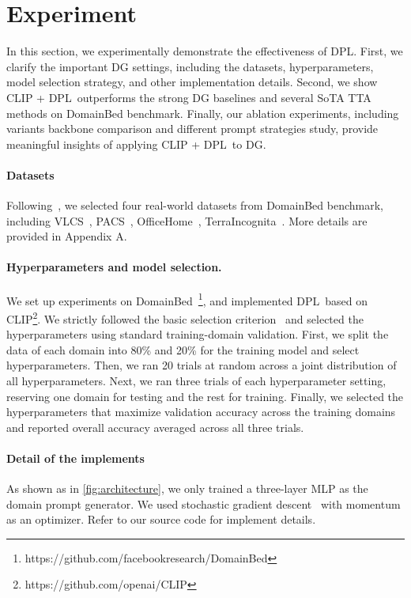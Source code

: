 \documentclass[letterpaper]{article} \usepackage[]{aaai23}
\newcommand{\dplshort}{DPL}
\begin{document}
\section{Experiment}

In this section, we experimentally demonstrate the effectiveness of \dplshort.
First, we clarify the important DG settings, including the datasets, hyperparameters, model selection strategy, and other implementation details.
Second, we show CLIP + \dplshort~outperforms the strong DG baselines and several SoTA TTA methods on DomainBed benchmark.
Finally, our ablation experiments, including variants backbone comparison and different prompt strategies study, provide meaningful insights of applying CLIP + \dplshort~to DG.

\paragraph{Datasets}
Following~\cite{iwasawa2021testtime}, we selected four real-world datasets from DomainBed benchmark, including VLCS~\cite{fang2013unbiased}, PACS~\cite{li2017deeper}, OfficeHome~\cite{venkateswara2017deep}, TerraIncognita~\cite{beery2018recognition}.
More details are provided in Appendix A.

\paragraph{Hyperparameters and model selection.} 
We set up experiments on DomainBed~\footnote{https://github.com/facebookresearch/DomainBed}, and implemented \dplshort~based on CLIP\footnote{https://github.com/openai/CLIP}.
We strictly followed the basic selection criterion~\cite{gulrajani2020search} and selected the hyperparameters using standard training-domain validation.
First, we split the data of each domain into 80\% and 20\% for the training model and select hyperparameters.
Then, we ran 20 trials at random across a joint distribution of all hyperparameters. 
Next, we ran three trials of each hyperparameter setting, reserving one domain for testing and the rest for training. 
Finally, we selected the hyperparameters that maximize validation accuracy across the training domains and reported overall accuracy averaged across all three trials.

\paragraph{Detail of the implements}
As shown as in \autoref{fig:architecture}, we only trained a three-layer MLP as the domain prompt generator.
We used stochastic gradient descent~\cite{bottou2012stochastic} with momentum as an optimizer.
Refer to our source code for implement details.
\end{document}
